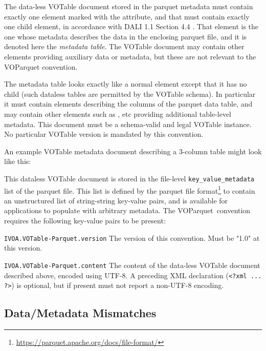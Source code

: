 \documentclass[11pt,a4paper]{ivoa}
\newcommand{\voparquet}{VOParquet}
\begin{document}
The data-less VOTable document stored in the parquet metadata
must contain exactly one  element marked with the
 attribute,
and that  must contain
exactly one  child element,
in accordance with DALI 1.1 Section 4.4 \citep{2017ivoa.spec.0517D}.
That  element is the one whose metadata describes
the data in the enclosing parquet file,
and it is denoted here the {\em metadata table}.
The VOTable document may contain other  elements
providing auxiliary data or metadata,
but these are not relevant to the VOParquet convention.

The metadata table looks exactly like a normal  element
except that it has no  child
(such dataless tables are permitted by the VOTable schema).
In particular it must contain  elements describing the
columns of the parquet data table,
and may contain other elements such as ,  etc
providing additional table-level metadata.
This document must be a schema-valid and legal VOTable instance.
No particular VOTable version is mandated by this convention.

An example VOTable metadata document describing a 3-column table
might look like this:


This dataless VOTable document is stored in the file-level
{\tt key\_value\_metadata} list of the parquet file.
This list is defined by the parquet file
format\footnote{\url{https://parquet.apache.org/docs/file-format/}}
to contain an unstructured list of string-string key-value pairs,
and is available for applications to populate with arbitrary metadata.
The \voparquet\ convention requires the following key-value pairs
to be present:
\begin{bigdescription}
\item[{\tt IVOA.VOTable-Parquet.version}]
   The version of this convention.  Must be "1.0" at this version.
\item[{\tt IVOA.VOTable-Parquet.content}]
   The content of the data-less VOTable document described above,
   encoded using UTF-8.
   A preceding XML declaration (\verb|<?xml ... ?>|) is optional,
   but if present must not report a non-UTF-8 encoding.
\end{bigdescription}

\subsection{Data/Metadata Mismatches}
\end{document}
